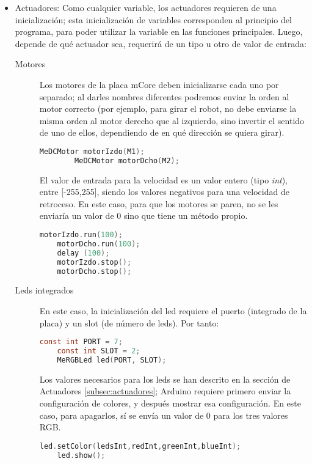 \begin{itemize}
\item Actuadores: Como cualquier variable, los actuadores requieren de una inicialización; esta inicialización de variables corresponden al principio del programa, para poder utilizar la variable en las funciones principales. Luego, depende de qué actuador sea, requerirá de un tipo u otro de valor de entrada:
\begin{description}
	\item [Motores] Los motores de la placa mCore deben inicializarse cada uno por separado; al darles nombres diferentes podremos enviar la orden al motor correcto (por ejemplo, para girar el robot, no debe enviarse la misma orden al motor derecho que al izquierdo, sino invertir el sentido de uno de ellos, dependiendo de en qué dirección se quiera girar). 
	\begin{lstlisting}[language=C,caption={Inicializar motores Mbot},captionpos=b]	
		MeDCMotor motorIzdo(M1);
		MeDCMotor motorDcho(M2);	
	\end{lstlisting}
	El valor de entrada para la velocidad es un valor entero (tipo \textit{int}), entre [-255,255], siendo los valores negativos para una velocidad de retroceso. En este caso, para que los motores se paren, no se les enviaría un valor de 0 sino que tiene un método propio.	
	\begin{lstlisting}[language=C,caption={Uso de motores Mbot},captionpos=b]		
	motorIzdo.run(100);
	motorDcho.run(100);
	delay (100);
	motorIzdo.stop();
	motorDcho.stop();	
	\end{lstlisting}

	\item [Leds integrados]  En este caso, la inicialización del led requiere el puerto (integrado de la placa) y un slot (de número de leds). Por tanto:
	\begin{lstlisting}[language=C,caption={Inicializar leds},captionpos=b]	
	const int PORT = 7;
	const int SLOT = 2;
	MeRGBLed led(PORT, SLOT);	
	\end{lstlisting}
	Los valores necesarios para los leds se han descrito en la sección de Actuadores \ref{subsec:actuadores}; Arduino requiere primero enviar la configuración de colores, y después mostrar esa configuración. En este caso, para apagarlos, sí se envía un valor de 0 para los tres valores RGB.
	\begin{lstlisting}[language=C,caption={Uso de los leds},captionpos=b]	
	led.setColor(ledsInt,redInt,greenInt,blueInt);
	led.show();	
	\end{lstlisting}


\end{description}
\end{itemize}
